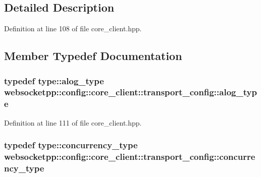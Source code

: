 \subsection{Detailed Description}


Definition at line 108 of file core\+\_\+client.\+hpp.



\subsection{Member Typedef Documentation}
\hypertarget{structwebsocketpp_1_1config_1_1core__client_1_1transport__config_aa41ba2c4801fadf51c399fd409118c61}{}
\subsubsection[{alog\+\_\+type}]{\setlength{\rightskip}{0pt plus 5cm}typedef {\bf type\+::alog\+\_\+type} {\bf websocketpp\+::config\+::core\+\_\+client\+::transport\+\_\+config\+::alog\+\_\+type}}\label{structwebsocketpp_1_1config_1_1core__client_1_1transport__config_aa41ba2c4801fadf51c399fd409118c61}


Definition at line 111 of file core\+\_\+client.\+hpp.

\hypertarget{structwebsocketpp_1_1config_1_1core__client_1_1transport__config_a5389723cc4121177af00f6f32fe0f89d}{}
\subsubsection[{concurrency\+\_\+type}]{\setlength{\rightskip}{0pt plus 5cm}typedef {\bf type\+::concurrency\+\_\+type} {\bf websocketpp\+::config\+::core\+\_\+client\+::transport\+\_\+config\+::concurrency\+\_\+type}}\label{structwebsocketpp_1_1config_1_1core__client_1_1transport__config_a5389723cc4121177af00f6f32fe0f89d}


